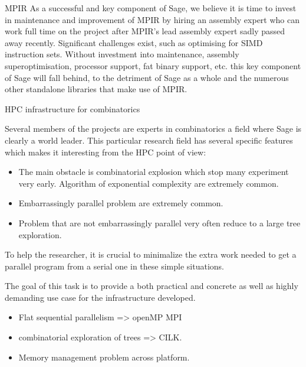 \begin{Workpackage}{\thewpno}
\begin{task}{MPIR}
As a successful and key component of Sage, we believe it is time to invest in
maintenance and improvement of MPIR by hiring an assembly expert who can work
full time on the project after MPIR's lead assembly expert sadly passed
away recently. Significant challenges exist, such as
optimising for SIMD instruction sets. Without investment into maintenance,
assembly superoptimisation, processor support, fat binary support, etc. this key
component of Sage will fall behind, to the detriment of Sage as a whole and the
numerous other standalone libraries that make use of MPIR.

\begin{WPDeliverables}
\end{WPDeliverables}
\end{task}


\begin{task}{HPC infrastructure for combinatorics}
  \label{task:hpc_combi}

  Several members of the projects are experts in combinatorics a field where
  Sage is clearly a world leader. This particular research field has several
  specific features which makes it interesting from the HPC point of view:
  \begin{itemize}
  \item The main obstacle is combinatorial explosion which stop many
    experiment very early. Algorithm of exponential complexity are extremely
    common.
  \item Embarrassingly parallel problem are extremely common.
  \item Problem that are not embarrassingly parallel very often reduce to a
    large tree exploration.
  \end{itemize}
  To help the researcher, it is crucial to minimalize the extra work needed to
  get a parallel program from a serial one in these simple situations.

  The goal of this task is to provide a both practical and concrete as well as
  highly demanding use case for the infrastructure developed.
  \begin{itemize}
  \item Flat sequential parallelism => openMP MPI
  \item combinatorial exploration of trees => CILK.
   \item Memory management problem across platform.
  \end{itemize}


\end{task}
\end{Workpackage}
